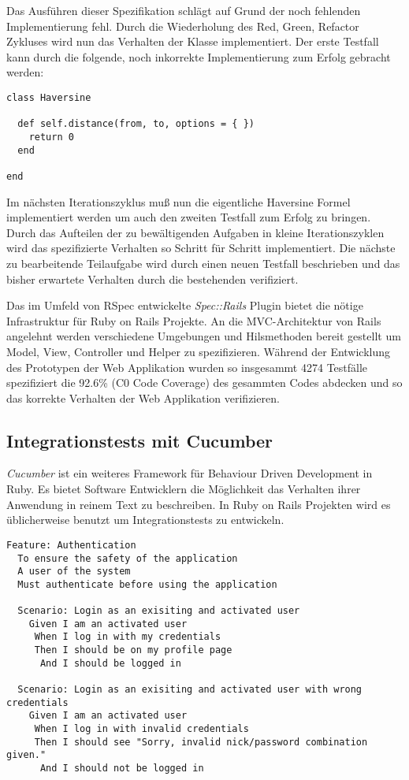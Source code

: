 Das Ausführen dieser Spezifikation schlägt auf Grund der noch
fehlenden Implementierung fehl. Durch die Wiederholung des Red, Green,
Refactor Zykluses wird nun das Verhalten der Klasse implementiert. Der
erste Testfall kann durch die folgende, noch inkorrekte
Implementierung zum Erfolg gebracht werden:

{\footnotesize
\begin{verbatim}
class Haversine

  def self.distance(from, to, options = { })
    return 0
  end

end
\end{verbatim}
}

Im nächsten Iterationszyklus muß nun die eigentliche Haversine Formel
implementiert werden um auch den zweiten Testfall zum Erfolg zu
bringen. Durch das Aufteilen der zu bewältigenden Aufgaben in kleine
Iterationszyklen wird das spezifizierte Verhalten so Schritt für
Schritt implementiert. Die nächste zu bearbeitende Teilaufgabe wird
durch einen neuen Testfall beschrieben und das bisher erwartete
Verhalten durch die bestehenden verifiziert.

Das im Umfeld von RSpec entwickelte \textit{Spec::Rails} Plugin bietet
die nötige Infrastruktur für Ruby on Rails Projekte. An die
MVC-Architektur von Rails angelehnt werden verschiedene Umgebungen und
Hilsmethoden bereit gestellt um Model, View, Controller und Helper zu
spezifizieren. Während der Entwicklung des Prototypen der Web
Applikation wurden so insgesammt 4274 Testfälle spezifiziert die
92.6\% (C0 Code Coverage) des gesammten Codes abdecken und so das
korrekte Verhalten der Web Applikation verifizieren.

\subsection{Integrationstests mit Cucumber}

\textit{Cucumber} \cite{cucumber} ist ein weiteres Framework für
Behaviour Driven Development in Ruby. Es bietet Software Entwicklern
die Möglichkeit das Verhalten ihrer Anwendung in reinem Text zu
beschreiben. In Ruby on Rails Projekten wird es üblicherweise benutzt
um Integrationstests zu entwickeln.

{\footnotesize
\begin{verbatim}
Feature: Authentication
  To ensure the safety of the application
  A user of the system
  Must authenticate before using the application

  Scenario: Login as an exisiting and activated user
    Given I am an activated user
     When I log in with my credentials
     Then I should be on my profile page
      And I should be logged in

  Scenario: Login as an exisiting and activated user with wrong credentials
    Given I am an activated user
     When I log in with invalid credentials
     Then I should see "Sorry, invalid nick/password combination given."
      And I should not be logged in
\end{verbatim}
}

